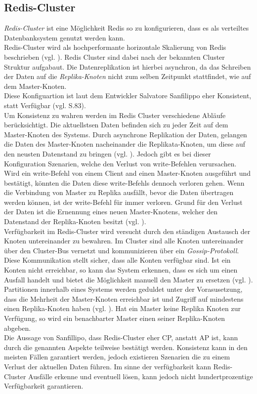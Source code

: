 \subsection{Redis-Cluster}
\textit{Redis-Cluster} ist eine Möglichkeit \acs{Redis} so zu konfigurieren, dass es als verteiltes Datenbanksystem genutzt werden kann. 
\\
Redis-Cluster wird als hochperformante horizontale Skalierung von Redis beschrieben (vgl. \cite{Redis-Cluster-Spec}). Redis Cluster sind dabei nach der bekannten Cluster Struktur aufgabaut. Die Datenreplikation ist hierbei asynchron, da das Schreiben der Daten auf die \textit{Replika-Knoten} nicht zum selben Zeitpunkt stattfindet, wie auf dem Master-Knoten.
\\
Diese Konfiguartion ist laut dem Entwickler Salvatore Sanfilippo eher Konsistent, statt Verfügbar (vgl. \cite{nosql} S.83).
\\
Um Konsistenz zu wahren werden im Redis Cluster verschiedene Abläufe berücksichtigt. Die aktuellstsen Daten befinden sich zu jeder Zeit auf dem Master-Knoten des Systems. Durch asynchrone Replikation der Daten, gelangen die Daten des Master-Knoten nacheinander die Replikata-Knoten, um diese auf den neusten Datenstand zu bringen (vgl. \cite{Redis-Cluster-Spec}).
Jedoch gibt es bei dieser Konfiguration Szenarien, welche den Verlust von write-Befehlen verursachen.
Wird ein write-Befehl von einem Client and einen Master-Knoten ausgeführt und bestätigt, könnten die Daten diese write-Befehls dennoch verloren gehen. Wenn die Verbindung von Master zu Replika ausfällt, bevor die Daten übertragen werden können, ist der write-Befehl für immer verloren. Grund für den Verlust der Daten ist die Ernennung eines neuen Master-Knotens, welcher den Datenstand der Replika-Knoten besitzt (vgl. \cite{Redis-Cluster-Spec}).
\\
Verfügbarkeit im Redis-Cluster wird versucht durch den ständigen Austausch der Knoten untereinander zu bewahren. Im Cluster sind alle Knoten untereinander über den Cluster-Bus vernetzt und kommunizieren über ein \textit{Gossip-Protokoll}. Diese Kommunikation stellt sicher, dass alle Konten verfügbar sind. Ist ein Konten nicht erreichbar, so kann das System erkennen, dass es sich um einen Ausfall handelt und bietet die Möglichkeit manuell den Master zu ersetzen (vgl. \cite{Redis-Cluster-Spec}).
\\
Partitionen innerhalb eines Systems werden geduldet unter der Vorasusetzung, dass die Mehrheit der Master-Knoten erreichbar ist und Zugriff auf mindestens einen Replika-Knoten haben (vgl. \cite{Redis-Cluster-Spec}). Hat ein Master keine Replika Knoten zur Verfügung, so wird ein benachbarter Master einen seiner Replika-Knoten abgeben.
\\
Die Aussage von Sanfillipo, dass Redis-Cluster eher CP, anstatt AP ist, kann durch die genannten Aspekte teilweise bestätigt werden. Konsistenz kann in den meisten Fällen garantiert werden, jedoch existieren Szenarien die zu einem Verlust der aktuellen Daten führen. Im sinne der verfügbarkeit kann Redis-Cluster Ausfälle erkenne und eventuell lösen, kann jedoch nicht hundertprozentige Verfügbarkeit garantieren.

